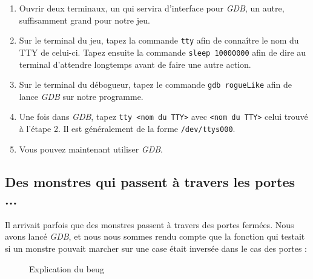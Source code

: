 \documentclass[11pt]{report}
\begin{document}
		\begin{enumerate}
		\item Ouvrir deux terminaux, un qui servira d'interface pour \emph{GDB}, un autre, suffisamment grand pour notre jeu.
		\item Sur le terminal du jeu, tapez la commande \texttt{tty} afin de connaître le nom du TTY de celui-ci. Tapez ensuite la commande \texttt{sleep 10000000} afin de dire au terminal d'attendre longtemps avant de faire une autre action.
		\item Sur le terminal du débogueur, tapez le commande \texttt{gdb rogueLike} afin de lance \emph{GDB} sur notre programme.
		\item Une fois dans \emph{GDB}, tapez \texttt{tty <nom du TTY>} avec \texttt{<nom du TTY>} celui trouvé à l'étape 2. Il est généralement de la forme \texttt{/dev/ttys000}.
		\item Vous pouvez maintenant utiliser \emph{GDB}.
		\end{enumerate}


	\subsection{Des monstres qui passent à travers les portes ...}
		Il arrivait parfois que des monstres passent à travers des portes fermées. Nous avons lancé \emph{GDB}, et nous nous sommes rendu compte que la fonction qui testait si un monstre pouvait marcher sur une case était inversée dans le cas des portes :

			\begin{figure}[ht]
			    \centering
			    \qquad
			    \caption{Explication du beug}%
			\end{figure}
\end{document}
